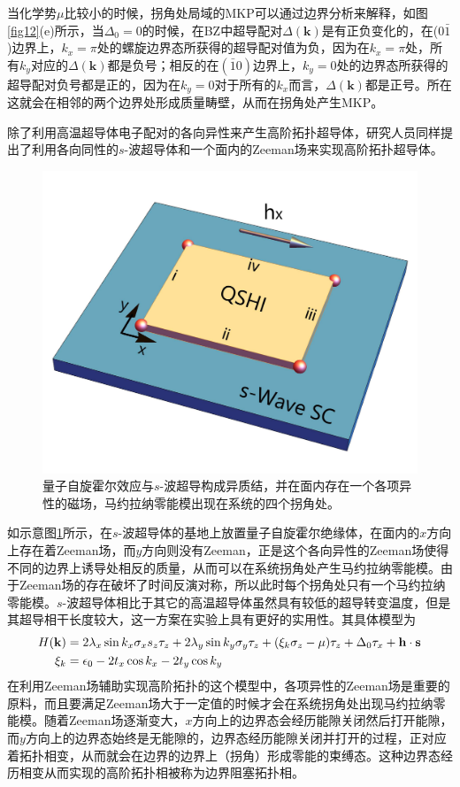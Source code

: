 \qquad 当化学势$\mu$比较小的时候，拐角处局域的MKP可以通过边界分析来解释，如图\ref{fig12}(e)所示，当$\Delta_0=0$的时候，在BZ中超导配对$\Delta(\mathbf{k})$是有正负变化的，在($0\bar{1}$)边界上，$k_x=\pi$处的螺旋边界态所获得的超导配对值为负，因为在$k_x=\pi$处，所有$k_y$对应的$\Delta(\mathbf{k})$都是负号；相反的在$(\bar{1}0)$边界上，$k_y=0$处的边界态所获得的超导配对负号都是正的，因为在$k_y=0$对于所有的$k_x$而言，$\Delta(\mathbf{k})$都是正号。所在这就会在相邻的两个边界处形成质量畴壁，从而在拐角处产生MKP。

\qquad 除了利用高温超导体电子配对的各向异性来产生高阶拓扑超导体，研究人员同样提出了利用各向同性的$s$-波超导体和一个面内的Zeeman场来实现高阶拓扑超导体\cite{re45}。
\begin{figure}[h]
\centering
\includegraphics[scale=0.2]{pic/fig14.pdf}
\caption{量子自旋霍尔效应与$s$-波超导构成异质结，并在面内存在一个各项异性的磁场，马约拉纳零能模出现在系统的四个拐角处。}\label{fig13}
\end{figure}
如示意图\ref{fig13}所示，在$s$-波超导体的基地上放置量子自旋霍尔绝缘体，在面内的$x$方向上存在着Zeeman场，而$y$方向则没有Zeeman，正是这个各向异性的Zeeman场使得不同的边界上诱导处相反的质量，从而可以在系统拐角处产生马约拉纳零能模。由于Zeeman场的存在破坏了时间反演对称，所以此时每个拐角处只有一个马约拉纳零能模。$s$-波超导体相比于其它的高温超导体虽然具有较低的超导转变温度，但是其超导相干长度较大，这一方案在实验上具有更好的实用性。其具体模型为
\begin{equation}
\begin{aligned}
H(\mathbf{k})&=2\lambda_x\sin k_x\sigma_xs_z\tau_z+2\lambda_y\sin k_y\sigma_y\tau_z+(\xi_k\sigma_z-\mu)\tau_z+\Delta_0\tau_x+{\bf h\cdot s}\\
\xi_k&=\epsilon_0-2t_x\cos k_x-2t_y\cos k_y\label{ze1}
\end{aligned}
\end{equation}
在利用Zeeman场辅助实现高阶拓扑的这个模型中，各项异性的Zeeman场是重要的原料，而且要满足Zeeman场大于一定值的时候才会在系统拐角处出现马约拉纳零能模。随着Zeeman场逐渐变大，$x$方向上的边界态会经历能隙关闭然后打开能隙，而$y$方向上的边界态始终是无能隙的，边界态经历能隙关闭并打开的过程，正对应着拓扑相变，从而就会在边界的边界上（拐角）形成零能的束缚态。这种边界态经历相变从而实现的高阶拓扑相被称为边界阻塞拓扑相\cite{re46}。
